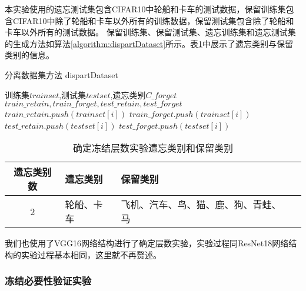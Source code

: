 本实验使用的遗忘测试集包含CIFAR10中轮船和卡车的测试数据，保留训练集包含CIFAR10中除了轮船和卡车以外所有的训练数据，保留测试集包含除了轮船和卡车以外所有的测试数据。
保留训练集、保留测试集、遗忘训练集和遗忘测试集的生成方法如算法\ref{algorithm:dispartDataset}所示。表\ref{tab:forget-continuous-2-kinds}中展示了遗忘类别与保留类别的信息。
\begin{algorithm}
	\renewcommand{\algorithmicrequire}{\textbf{Input:}}
	\renewcommand{\algorithmicensure}{\textbf{Output:}}
	\caption{分离数据集方法  dispartDataset}
	\label{algorithm:dispartDataset}
	\begin{algorithmic}[1]
        \REQUIRE 训练集$trainset$,测试集$testset$,遗忘类别$C\_forget$
        \ENSURE  $train\_retain,train\_forget,test\_retain,test\_forget$
                \STATE $ train\_retain.push(trainset[i])$
            \ELSE
                \STATE $ train\_forget.push(trainset[i])$
            \ENDIF
                \STATE $ test\_retain.push(testset[i])$
            \ELSE
                \STATE $ test\_forget.push(testset[i])$
            \ENDIF
        \ENDFOR
	\end{algorithmic}  
\end{algorithm}
\begin{table}
    \centering
    \caption{确定冻结层数实验遗忘类别和保留类别}
    \begin{tabular}{cp{3cm}p{7cm}p{7cm}}
      \toprule 
      遗忘类别数  & 遗忘类别 & 保留类别  \\
      \midrule
      2 & 轮船、卡车  & 飞机、汽车、鸟、猫、鹿、狗、青蛙、马  \\
      \bottomrule
    \end{tabular}
    \label{tab:forget-continuous-2-kinds}
\end{table}
我们也使用了VGG16网络结构进行了确定层数实验，实验过程同ResNet18网络结构的实验过程基本相同，这里就不再赘述。

\subsubsection{冻结必要性验证实验}

